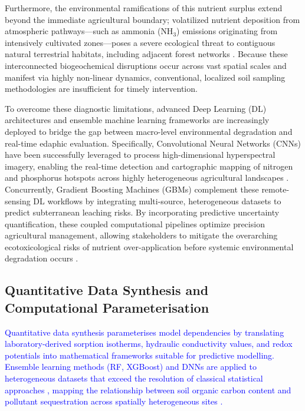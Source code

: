 \documentclass[environments,article,submit,pdftex,moreauthors]{Definitions/mdpi}
\begin{document}
Furthermore, the environmental ramifications of this nutrient surplus extend beyond the immediate agricultural boundary; volatilized nutrient deposition from atmospheric pathways—such as ammonia ($\text{NH}_3$) emissions originating from intensively cultivated zones—poses a severe ecological threat to contiguous natural terrestrial habitats, including adjacent forest networks \cite{Koukianaki2025}. Because these interconnected biogeochemical disruptions occur across vast spatial scales and manifest via highly non-linear dynamics, conventional, localized soil sampling methodologies are insufficient for timely intervention. 

To overcome these diagnostic limitations, advanced Deep Learning (DL) architectures and ensemble machine learning frameworks are increasingly deployed to bridge the gap between macro-level environmental degradation and real-time edaphic evaluation. Specifically, Convolutional Neural Networks (CNNs) have been successfully leveraged to process high-dimensional hyperspectral imagery, enabling the real-time detection and cartographic mapping of nitrogen and phosphorus hotspots across highly heterogeneous agricultural landscapes \cite{Liu1842390}. Concurrently, Gradient Boosting Machines (GBMs) complement these remote-sensing DL workflows by integrating multi-source, heterogeneous datasets to predict subterranean leaching risks. By incorporating predictive uncertainty quantification, these coupled computational pipelines optimize precision agricultural management, allowing stakeholders to mitigate the overarching ecotoxicological risks of nutrient over-application before systemic environmental degradation occurs \cite{Zhangetal2026}.

\subsection{Quantitative Data Synthesis and Computational
    Parameterisation}\label{sec2.2}

\textcolor{blue}{Quantitative data synthesis parameterises model dependencies by translating laboratory-derived sorption isotherms, hydraulic conductivity values, and redox potentials into mathematical frameworks suitable for predictive modelling. Ensemble learning methods (RF, XGBoost) and DNNs are applied to heterogeneous datasets that exceed the resolution of classical statistical approaches \cite{2939785}, mapping the relationship between soil organic carbon content and pollutant sequestration across spatially heterogeneous sites \cite{Taghizadeh}.}
\end{document}
